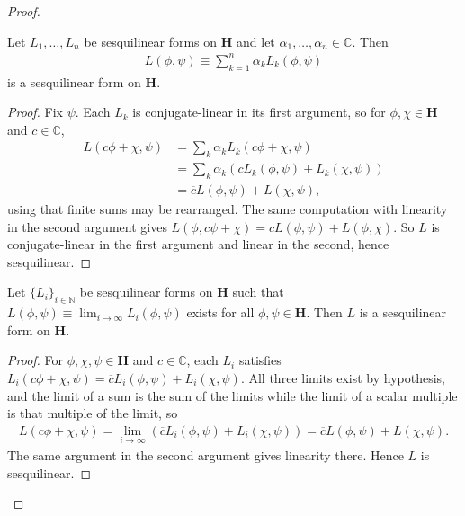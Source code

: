 \begin{proof}
\begin{lemma}
    \label{lmm:sesquilinear-linear-combination}
    \leanok
    Let $L_1, \ldots, L_n$ be sesquilinear forms on $\mathbf{H}$ and let $\alpha_1, \ldots, \alpha_n \in \mathbb{C}$. Then
    \begin{align}
        L(\phi,\psi) \equiv \sum_{k=1}^n \alpha_k L_k(\phi,\psi)
    \end{align}
    is a sesquilinear form on $\mathbf{H}$.
\end{lemma}
\begin{proof}
    \leanok
Fix $\psi$. Each $L_k$ is conjugate-linear in its first argument, so for $\phi, \chi \in \mathbf{H}$ and $c \in \mathbb{C}$,
\begin{align}
    L(c\phi + \chi, \psi) &= \sum_k \alpha_k L_k(c\phi+\chi,\psi) \\
                &= \sum_k \alpha_k \left( \overline{c} L_k(\phi,\psi) + L_k(\chi,\psi) \right) \\
                &= \overline{c} L(\phi,\psi) + L(\chi,\psi),
\end{align}
using that finite sums may be rearranged. The same computation with linearity in the second argument gives $L(\phi, c\psi + \chi) = c L(\phi,\psi) + L(\phi,\chi)$. So $L$ is conjugate-linear in the first argument and linear in the second, hence sesquilinear.
\end{proof}

\begin{lemma}
    \label{lmm:sesquilinear-pointwise-limit}
    \leanok
    Let $\{L_i\}_{i \in \mathbb{N}}$ be sesquilinear forms on $\mathbf{H}$ such that $L(\phi,\psi) \equiv \lim_{i \rightarrow \infty} L_i(\phi,\psi)$ exists for all $\phi,\psi \in \mathbf{H}$. Then $L$ is a sesquilinear form on $\mathbf{H}$.
\end{lemma}
\begin{proof}
    \leanok
For $\phi,\chi,\psi \in \mathbf{H}$ and $c \in \mathbb{C}$, each $L_i$ satisfies $L_i(c\phi+\chi,\psi) = \overline{c}L_i(\phi,\psi) + L_i(\chi,\psi)$. All three limits exist by hypothesis, and the limit of a sum is the sum of the limits while the limit of a scalar multiple is that multiple of the limit, so
\begin{align}
    L(c\phi+\chi,\psi) = \lim_{i \rightarrow \infty} \left( \overline{c}L_i(\phi,\psi) + L_i(\chi,\psi) \right) = \overline{c}L(\phi,\psi) + L(\chi,\psi).
\end{align}
The same argument in the second argument gives linearity there. Hence $L$ is sesquilinear.
\end{proof}


\end{proof}
